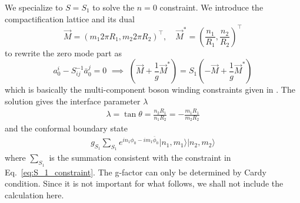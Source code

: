 
We specialize to $S = S_1$ to solve the $ n = 0$ constraint. We introduce the compactification lattice and its dual\cite{affleck_quantum_2001,oshikawa_boundary_2010}
\begin{equation}
\label{eq:lattice}
\vec{M} = (m_1 2 \pi R_1, m_2 2\pi  R_2)^\top, \quad  \vec{M}^* = (\frac{n_1}{R_1}, \frac{n_2}{R_2})^\top
\end{equation}
to rewrite the zero mode part as 
\begin{equation}
  a_0^i - S^{-1} _{ij} \bar{a}_{0}^j = 0 \,\, \implies \,\, ( \vec{M} + \frac{1}{g}\vec{M}^* ) = S_1 ( -\vec{M} + \frac{1}{g}\vec{M}^* )
\end{equation}
which is basically the multi-component boson winding constraints given in . The solution gives the interface parameter $\lambda$
\begin{equation}
\begin{aligned}
\label{eq:S_1_constraint}
\lambda = \tan\theta=\frac{n_2R_1}{n_1R_2}=-\frac{m_1R_1}{m_2R_2}
\end{aligned}
\end{equation}
and the conformal boundary state
\begin{equation}\begin{aligned}
\label{eq:S1bd-state}
g_{S_1}\sum_{S_1}e^{in_1\phi_0-im_1\bar{\phi}_0}|n_1,m_1\rangle|n_2,m_2\rangle
\end{aligned}\end{equation}
where $\sum_{S_1}$ is the summation consistent with the constraint in Eq.~\eqref{eq:S_1_constraint}. The g-factor can only be determined by Cardy condition\cite{cardy_boundary_2004}. Since it is not important for what follows, we shall not include the calculation here. 

